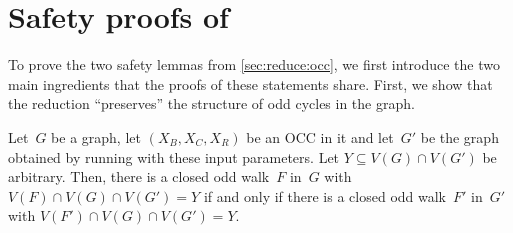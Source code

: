 \section{Safety proofs of }
To prove the two safety lemmas from \cref{sec:reduce:occ}, we first introduce the two main ingredients that the proofs of these statements share. First, we show that the reduction ``preserves'' the structure of odd cycles in the graph.

\begin{lemma} \label{lem:odd:cycle:preservation}
	Let~$G$ be a graph, let $(X_B, X_C, X_R)$ be an OCC in it and let~$G'$ be the graph obtained by running  with these input parameters. Let $Y \subseteq V(G) \cap V(G')$ be arbitrary. Then, there is a closed odd walk~$F$ in~$G$ with $V(F) \cap V(G) \cap V(G') = Y$ if and only if there is a closed odd walk~$F'$ in~$G'$ with $V(F') \cap V(G) \cap V(G') = Y$.
\end{lemma}
